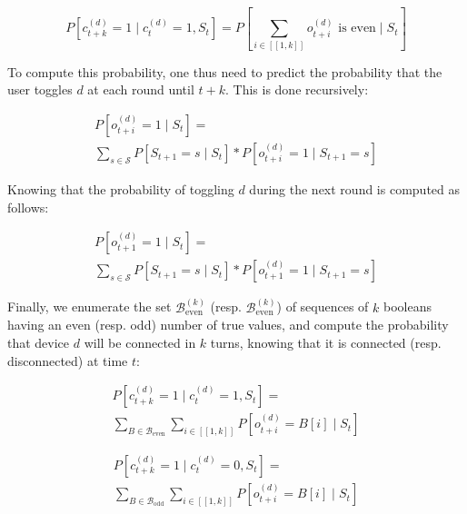 $$
P\left[c^{(d)}_{t+k}=1 \mid c^{(d)}_{t}=1 ,S_t \right]= P\left[ \sum\limits_{i\in[\![ 1,k]\!]}o^{(d)}_{t+i} \text{ is even} \mid S_t\right] 
$$

To compute this probability, one thus need to predict the probability that the user toggles $d$ at each round until $t+k$. This is done recursively:

\begin{multline*}
P\left[o^{(d)}_{t+i}=1 \mid S_{t} \right] = \\
\sum\limits_{s \in \mathcal{S}} P\left[ S_{t+1}=s \mid S_t\right] * P\left[o^{(d)}_{t+i}=1 \mid S_{t+1}=s \right]
\end{multline*}


Knowing that the probability of toggling $d$ during the next round is computed as follows:

\begin{multline*}
P\left[o^{(d)}_{t+1}= 1 \mid S_{t} \right]=\\
\sum\limits_{s \in \mathcal{S}} P\left[ S_{t+1}=s \mid S_{t}\right] * P\left[ o^{(d)}_{t+1}=1 \mid S_{t+1}=s\right] 
\end{multline*}

Finally, we enumerate the set $\mathcal{B}^{(k)}_\text{even}$ (resp. $\mathcal{B}^{(k)}_\text{even}$) of sequences of $k$ booleans having an even (resp. odd) number of true values, and compute the probability that device $d$ will be connected in $k$ turns, knowing that it is connected (resp. disconnected) at time $t$:

\begin{multline*}
P\left[c^{(d)}_{t+k}=1 \mid c^{(d)}_{t}=1 ,S_t \right]=\\
\sum\limits_{B \in \mathcal{B}_\text{even}}\sum\limits_{i\in[\![ 1,k]\!]} P\left[o^{(d)}_{t+i}= B\left[i\right] \mid S_{t} \right]
\end{multline*}

\begin{multline*}
P\left[c^{(d)}_{t+k}=1 \mid c^{(d)}_{t}=0 ,S_t \right]=\\
\sum\limits_{B \in \mathcal{B}_\text{odd}}\sum\limits_{i\in[\![ 1,k]\!]} P\left[o^{(d)}_{t+i}= B\left[i\right] \mid S_{t} \right]
\end{multline*}


